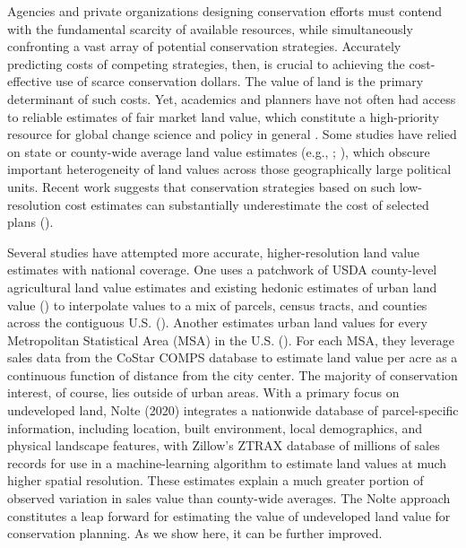 \documentclass[12pt]{article}
\begin{document}
Agencies and private organizations designing conservation efforts must contend with the fundamental scarcity of available resources, while simultaneously confronting a vast array of potential conservation strategies. Accurately predicting costs of competing strategies, then, is crucial to achieving the cost-effective use of scarce conservation dollars. The value of land is the primary determinant of such costs. Yet, academics and planners have not often had access to reliable estimates of fair market land value, which constitute a high-priority resource for global change science and policy in general \cite{Coomes2018GeospatialPolicy} . Some studies have relied on state or county-wide average land value estimates (e.g., \cite{Withey2012MaximisingUSA}; \cite{Lawler2020PlanningConfiguration}),
which obscure important heterogeneity of land values across those geographically large political units. Recent work suggests that conservation strategies based on such low-resolution cost estimates can substantially underestimate the cost of selected plans (\cite{Nolte2020High-resolutionStates}). 

Several studies have attempted more accurate, higher-resolution land value estimates with national coverage. One uses a patchwork of USDA county-level agricultural land value estimates and existing hedonic estimates of urban land value (\cite{Kuminoff2013}) to interpolate values to a mix of parcels, census tracts, and counties across the contiguous U.S. (\cite{Larson2015}). Another estimates urban land values for every Metropolitan Statistical Area (MSA) in the U.S. (\cite{Albouy2018}). For each MSA, they leverage sales data from the CoStar COMPS database to estimate land value per acre as a continuous function of distance from the city center. The majority of conservation interest, of course, lies outside of urban areas. With a primary focus on undeveloped land, Nolte (2020) integrates a nationwide database of parcel-specific information, including location, built environment, local demographics, and physical landscape features, with Zillow’s ZTRAX database of millions of sales records for use in a machine-learning algorithm to estimate land values at much higher spatial resolution. These estimates explain a much greater portion of observed variation in sales value than county-wide averages. The Nolte approach constitutes a leap forward for estimating the value of undeveloped land value for conservation planning. As we show here, it can be further improved.
\end{document}
